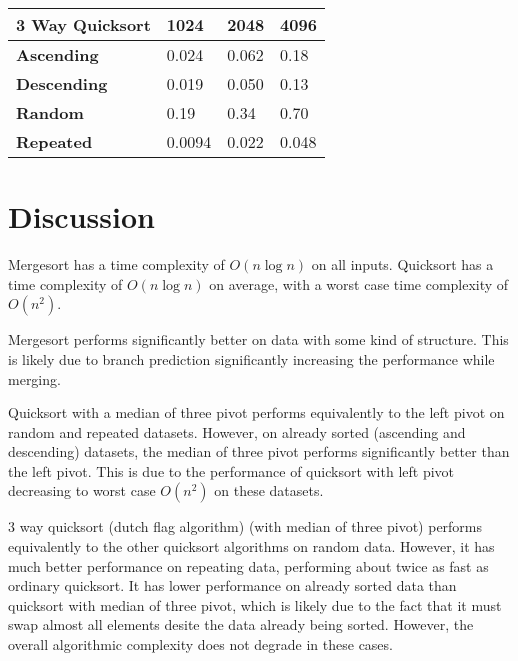 \documentclass{article}
\begin{document}
\begin{table}[H]
\centering
\begin{tabularx}{\linewidth}{| X | X | X | X |}
\hline
\textbf{3 Way Quicksort} & \textbf{1024} & \textbf{2048} & \textbf{4096} \\
\hline
\textbf{Ascending} & 0.024 & 0.062 & 0.18 \\
\hline
\textbf{Descending} & 0.019 & 0.050 & 0.13 \\
\hline
\textbf{Random}  & 0.19 & 0.34 & 0.70 \\
\hline
\textbf{Repeated} & 0.0094 & 0.022 & 0.048 \\
\hline
\end{tabularx}
\end{table}

\section{Discussion}
Mergesort has a time complexity of $O\left(n\log n\right)$ on all inputs.
Quicksort has a time complexity of $O\left(n\log n\right)$ on average,
with a worst case time complexity of $O\left(n^2\right)$.

Mergesort performs significantly better on data with some kind of structure.
This is likely due to branch prediction significantly increasing the performance
while merging.

Quicksort with a median of three pivot performs equivalently to the left pivot
on random and repeated datasets. However, on already sorted (ascending and descending)
datasets, the median of three pivot performs significantly better than the left pivot.
This is due to the performance of quicksort with left pivot decreasing to worst case
$O\left(n^2\right)$ on these datasets.

3 way quicksort (dutch flag algorithm) (with median of three pivot) performs equivalently
to the other quicksort algorithms on random data. However, it has much better performance
on repeating data, performing about twice as fast as ordinary quicksort.
It has lower performance on already sorted data than quicksort with median of three pivot,
which is likely due to the fact that it must swap almost all elements desite the data
already being sorted. However, the overall algorithmic complexity does not degrade in these cases.
\end{document}
